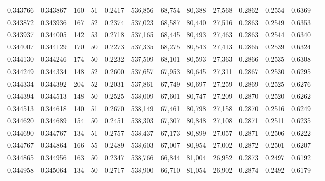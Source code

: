 \begin{tabular}{rrrrrrrrrrrrr}
0.343766 & 0.343867 &   160 &  51 &                                     0.2417 & 536,856 &  68,754 &  80,388 &  27,568 & 0.2862 & 0.2554 & 0.6369 \\
0.343872 & 0.343936 &   167 &  52 &                                     0.2374 & 537,023 &  68,587 &  80,440 &  27,516 & 0.2863 & 0.2549 & 0.6353 \\
0.343937 & 0.344005 &   142 &  53 &                                     0.2718 & 537,165 &  68,445 &  80,493 &  27,463 & 0.2863 & 0.2544 & 0.6340 \\
0.344007 & 0.344129 &   170 &  50 &                                     0.2273 & 537,335 &  68,275 &  80,543 &  27,413 & 0.2865 & 0.2539 & 0.6324 \\
0.344130 & 0.344246 &   174 &  50 &                                     0.2232 & 537,509 &  68,101 &  80,593 &  27,363 & 0.2866 & 0.2535 & 0.6308 \\
0.344249 & 0.344334 &   148 &  52 &                                     0.2600 & 537,657 &  67,953 &  80,645 &  27,311 & 0.2867 & 0.2530 & 0.6295 \\
0.344334 & 0.344392 &   204 &  52 &                                     0.2031 & 537,861 &  67,749 &  80,697 &  27,259 & 0.2869 & 0.2525 & 0.6276 \\
0.344394 & 0.344513 &   148 &  50 &                                     0.2525 & 538,009 &  67,601 &  80,747 &  27,209 & 0.2870 & 0.2520 & 0.6262 \\
0.344513 & 0.344618 &   140 &  51 &                                     0.2670 & 538,149 &  67,461 &  80,798 &  27,158 & 0.2870 & 0.2516 & 0.6249 \\
0.344620 & 0.344689 &   154 &  50 &                                     0.2451 & 538,303 &  67,307 &  80,848 &  27,108 & 0.2871 & 0.2511 & 0.6235 \\
0.344690 & 0.344767 &   134 &  51 &                                     0.2757 & 538,437 &  67,173 &  80,899 &  27,057 & 0.2871 & 0.2506 & 0.6222 \\
0.344767 & 0.344864 &   166 &  55 &                                     0.2489 & 538,603 &  67,007 &  80,954 &  27,002 & 0.2872 & 0.2501 & 0.6207 \\
0.344865 & 0.344956 &   163 &  50 &                                     0.2347 & 538,766 &  66,844 &  81,004 &  26,952 & 0.2873 & 0.2497 & 0.6192 \\
0.344958 & 0.345064 &   134 &  50 &                                     0.2717 & 538,900 &  66,710 &  81,054 &  26,902 & 0.2874 & 0.2492 & 0.6179 \\

\end{tabular}
